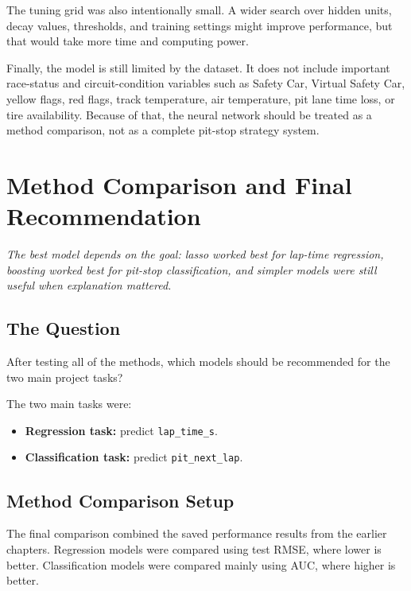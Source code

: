 \documentclass[11pt,oneside,openany]{book}
\newcommand{\chapterquote}[1]{%
\begin{center}
\small\textit{#1}
\end{center}
\vspace{-0.5em}
}
\begin{document}
The tuning grid was also intentionally small. A wider search over hidden units, decay values, thresholds, and training settings might improve performance, but that would take more time and computing power.

Finally, the model is still limited by the dataset. It does not include important race-status and circuit-condition variables such as Safety Car, Virtual Safety Car, yellow flags, red flags, track temperature, air temperature, pit lane time loss, or tire availability. Because of that, the neural network should be treated as a method comparison, not as a complete pit-stop strategy system.



\chapter{Method Comparison and Final Recommendation}
\chapterquote{The best model depends on the goal: lasso worked best for lap-time regression, boosting worked best for pit-stop classification, and simpler models were still useful when explanation mattered.}

\section{The Question}

After testing all of the methods, which models should be recommended for the two main project tasks?

The two main tasks were:

\begin{itemize}
    \item \textbf{Regression task:} predict \texttt{lap\_time\_s}.
    \item \textbf{Classification task:} predict \texttt{pit\_next\_lap}.
\end{itemize}

\section{Method Comparison Setup}

The final comparison combined the saved performance results from the earlier chapters. Regression models were compared using test RMSE, where lower is better. Classification models were compared mainly using AUC, where higher is better.
\end{document}
